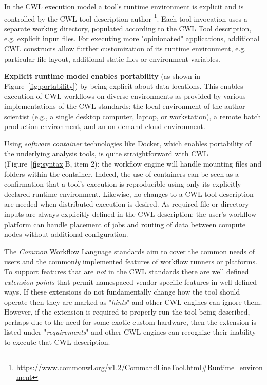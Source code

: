 \documentclass[sigconf,authordraft]{acmart}
\begin{document}
In the CWL execution model a tool's runtime environment is explicit and is controlled by the CWL tool description author \footnote{\url{https://www.commonwl.org/v1.2/CommandLineTool.html\#Runtime_environment}}. Each tool invocation uses a separate working directory, populated according to the CWL Tool description, e.g. explicit input files. For executing more "opinionated" applications, additional CWL constructs allow further customization of its runtime environment, e.g. particular file layout, additional static files or environment variables.

\textbf{Explicit runtime model enables portability} (as shown in Figure~\ref{fig:portability}) by being explicit about data locations. This enables execution of CWL workflows on diverse environments as provided by various implementations of the CWL standards: the local environment of the author-scientist (e.g., a single desktop computer, laptop, or workstation), a remote batch production-environment, and an on-demand cloud environment.

Using \textit{software container} technologies like Docker, which enables portability of the underlying analysis tools, is quite straightforward with CWL (Figure~\ref{fig:syntax}B, item 2): the workflow engine will handle mounting files and folders within the container. Indeed, the use of containers can be seen as a confirmation that a tool’s execution is reproducible using only its explicitly declared runtime environment. Likewise, no changes to a CWL tool description are needed when distributed execution is desired. As required file or directory inputs are always explicitly defined in the CWL description; the user's workflow platform can handle placement of jobs and routing of data between compute nodes without additional configuration.

The \textit{Common} Workflow Language standards aim to cover the common needs of users and the common\textit{ly} implemented features of workflow runners or platforms. To support features that are \textit{not} in the CWL standards there are well defined \textit{extension points} that permit namespaced vendor-specific features in well defined ways. If these extensions do not fundamentally change how the tool should operate then they are marked as "\textit{hints}" and other CWL engines can ignore them. However, if the extension is required to properly run the tool being described, perhaps due to the need for some exotic custom hardware, then the extension is listed under "\textit{requirements}" and other CWL engines can recognize their inability to execute that CWL description.
\end{document}
